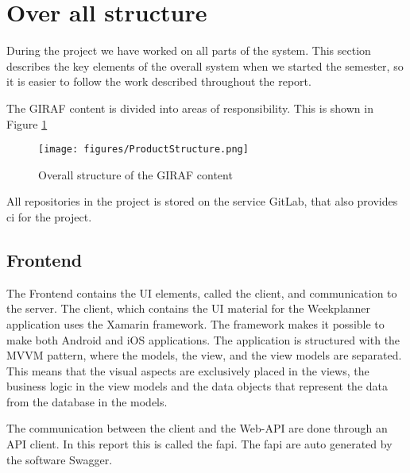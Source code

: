 \section{Over all structure}

During the project we have worked on all parts of the system. This section describes the key elements of the overall system when we started the semester, so it is easier to follow the work described throughout the report. 

The GIRAF content is divided into areas of responsibility. This is shown in Figure \ref{fig:ProductStructure}

\begin{figure}[H]
    \begin{center}
        \texttt{[image: figures/ProductStructure.png]}
    \end{center}
    \caption{Overall structure of the GIRAF content}
    \label{fig:ProductStructure}
\end{figure}

All repositories in the project is stored on the service GitLab, that also provides \gls{ci} for the project. 

\subsection{Frontend}
The Frontend contains the UI elements, called the client, and communication to the server. The client, which contains the UI material for the Weekplanner application uses the Xamarin framework. The framework makes it possible to make both Android and iOS applications. The application is structured with the MVVM pattern, where the models, the view, and the view models are separated. This means that the visual aspects are exclusively placed in the views, the business logic in the view models and the data objects that represent the data from the database in the models.

The communication between the client and the Web-API are done through an API client. In this report this is called the \gls{fapi}. The \gls{fapi} are auto generated by the software Swagger.

